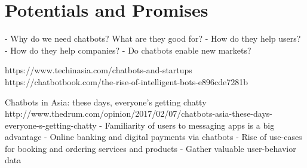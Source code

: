\section{Potentials and Promises}




-	Why do we need chatbots? What are they good for?
-	How do they help users?
-	How do they help companies?
-	Do chatbots enable new markets?

https://www.techinasia.com/chatbots-and-startups
https://chatbotbook.com/the-rise-of-intelligent-bots-e896cde7281b


Chatbots in Asia: these days, everyone’s getting chatty
http://www.thedrum.com/opinion/2017/02/07/chatbots-asia-these-days-everyone-s-getting-chatty
- Familiarity of users to messaging apps is a big advantage
- Online banking and digital payments via chatbots
- Rise of use-cases for booking and ordering services and products
- Gather valuable user-behavior data

